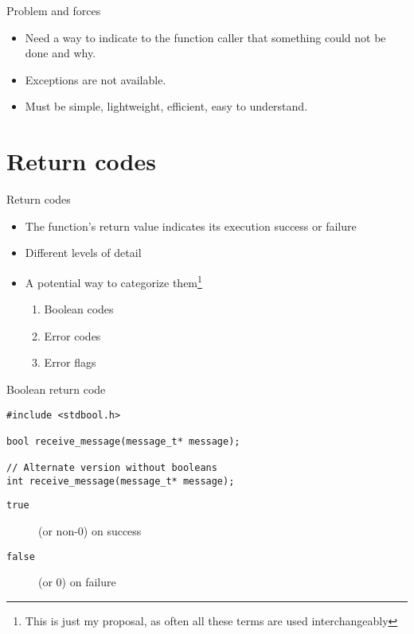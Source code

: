 \documentclass[aspectratio=169,14pt]{beamer}
\begin{document}
\begin{frame}{Problem and forces}
\begin{itemize}
    \item Need a way to indicate to the function caller that something could not be done and why.
    \item Exceptions are not available.
    \item Must be simple, lightweight, efficient, easy to understand.
\end{itemize}
\end{frame}





\section{Return codes}

\begin{frame}{Return codes}
\begin{itemize}
    \item The function's return value indicates its execution success or failure
    \item Different levels of detail
    \item A potential way to categorize them\footnote{This is just my proposal, as often all these terms are used interchangeably}\\
    \begin{enumerate}
        \item Boolean codes
        \item Error codes
        \item Error flags
    \end{enumerate}
\end{itemize}
\end{frame}



\begin{frame}[fragile]{Boolean return code}
\begin{lstlisting}[style=cstyle]
#include <stdbool.h>

bool receive_message(message_t* message);

// Alternate version without booleans
int receive_message(message_t* message);
\end{lstlisting}

\begin{description}
    \item[\texttt{true}] (or non-0) on success
    \item[\texttt{false}] (or 0) on failure
\end{description}
\end{frame}
\end{document}

